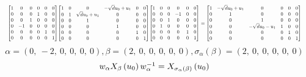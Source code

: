 \documentclass[11pt]{article}
\theoremstyle{definition}
\begin{document}
\[
\scaletoalign{\textwidth}{{\left[\begin{matrix}1 & 0 & 0 & 0 & 0 & 0\\0 & 0 & 0 & 1 & 0 & 0\\0 & 0 & 1 & 0 & 0 & 0\\0 & -1 & 0 & 0 & 0 & 0\\0 & 0 & 0 & 0 & 1 & 0\\0 & 0 & 0 & 0 & 0 & 1\end{matrix}\right]} {\left[\begin{matrix}1 & 0 & 0 & - \sqrt{d} u_{0} + u_{1} & 0 & 0\\0 & 1 & \sqrt{d} u_{0} + u_{1} & 0 & 0 & 0\\0 & 0 & 1 & 0 & 0 & 0\\0 & 0 & 0 & 1 & 0 & 0\\0 & 0 & 0 & 0 & 1 & 0\\0 & 0 & 0 & 0 & 0 & 1\end{matrix}\right]} {\left[\begin{matrix}1 & 0 & 0 & 0 & 0 & 0\\0 & 0 & 0 & -1 & 0 & 0\\0 & 0 & 1 & 0 & 0 & 0\\0 & 1 & 0 & 0 & 0 & 0\\0 & 0 & 0 & 0 & 1 & 0\\0 & 0 & 0 & 0 & 0 & 1\end{matrix}\right]} = {\left[\begin{matrix}1 & - \sqrt{d} u_{0} + u_{1} & 0 & 0 & 0 & 0\\0 & 1 & 0 & 0 & 0 & 0\\0 & 0 & 1 & 0 & 0 & 0\\0 & 0 & - \sqrt{d} u_{0} - u_{1} & 1 & 0 & 0\\0 & 0 & 0 & 0 & 1 & 0\\0 & 0 & 0 & 0 & 0 & 1\end{matrix}\right]}}
\]
\[
\alpha = \left( 0, \  -2, \  0, \  0, \  0, \  0\right), \beta = \left( 2, \  0, \  0, \  0, \  0, \  0\right), \sigma_{\alpha}(\beta) = \left( 2, \  0, \  0, \  0, \  0, \  0\right)
\]
\[
\scaletoalign{\textwidth}{w_{\alpha} X_{\beta}\left(u_{0}\right) w_{\alpha}^{-1} = X_{\sigma_{\alpha}\left(\beta\right)}\left(u_{0}\right)}
\]
\end{document}
